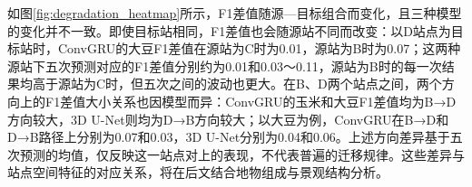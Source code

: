 
如图\ref{fig:degradation_heatmap}所示，F1差值随源—目标组合而变化，且三种模型的变化并不一致。即使目标站相同，F1差值也会随源站不同而改变：以D站点为目标站时，ConvGRU的大豆F1差值在源站为C时为0.01，源站为B时为0.07；这两种源站下五次预测对应的F1差值分别约为0.01和0.03～0.11，源站为B时的每一次结果均高于源站为C时，但五次之间的波动也更大。在B、D两个站点之间，两个方向上的F1差值大小关系也因模型而异：ConvGRU的玉米和大豆F1差值均为B→D方向较大，3D U-Net则均为D→B方向较大；以大豆为例，ConvGRU在B→D和D→B路径上分别为0.07和0.03，3D U-Net分别为0.04和0.06。上述方向差异基于五次预测的均值，仅反映这一站点对上的表现，不代表普遍的迁移规律。这些差异与站点空间特征的对应关系，将在后文结合地物组成与景观结构分析。

